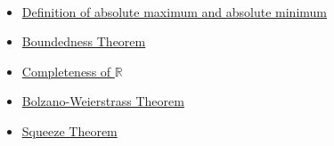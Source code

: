\begin{remark*}[Dependencies]~\\
\begin{itemize}
  \item \hyperref[def:absolute-extrema]{Definition of absolute maximum and absolute minimum}
  \item \hyperref[thm:boundedness-theorem]{Boundedness Theorem}
  \item \hyperref[thm:completeness-real-numbers]{Completeness of $\mathbb{R}$}
  \item \hyperref[thm:bolzano-weierstrass]{Bolzano-Weierstrass Theorem}
  \item \hyperref[thm:squeeze-theorem]{Squeeze Theorem}
\end{itemize}
\end{remark*}
